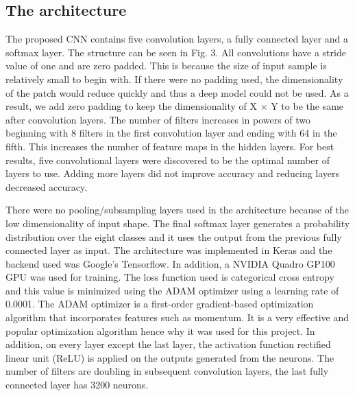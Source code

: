 \documentclass[letterpaper, 10 pt, conference]{ieeeconf}  %
\begin{document}
\subsection{The architecture}
The proposed CNN contains five convolution layers, a fully connected layer and a softmax layer. The structure can be seen in Fig. 3. All convolutions have a stride value of one and are zero padded. This is because the size of input sample is relatively small to begin with. If there were no padding used, the dimensionality of the patch would reduce quickly and thus a deep model could not be used. As a result, we add zero padding to keep the dimensionality of X $\times$ Y to be the same after convolution layers. The number of filters increases in powers of two beginning with 8 filters in the first convolution layer and ending with 64 in the fifth. This increases the number of feature maps in the hidden layers. For best results, five convolutional layers were discovered to be the optimal number of layers to use. Adding more layers did not improve accuracy and reducing layers decreased accuracy.

There were no pooling/subsampling layers used in the architecture because of the low dimensionality of input shape. The final softmax layer generates a probability distribution over the eight classes and it uses the output from the previous fully connected layer as input. The architecture was implemented in Keras and the backend used was Google's Tensorflow. In addition, a NVIDIA Quadro GP100 GPU was used for training. The loss function used is categorical cross entropy and this value is minimized using the ADAM optimizer using a learning rate of 0.0001. The ADAM optimizer is a first-order gradient-based optimization algorithm that incorporates features such as momentum. It is a very effective and popular optimization algorithm hence why it was used for this project. In addition, on every layer except the last layer, the activation function rectified linear unit (ReLU) is applied on the outputs generated from the neurons. The number of filters are doubling in subsequent convolution layers, the last fully connected layer has 3200 neurons.
\end{document}
